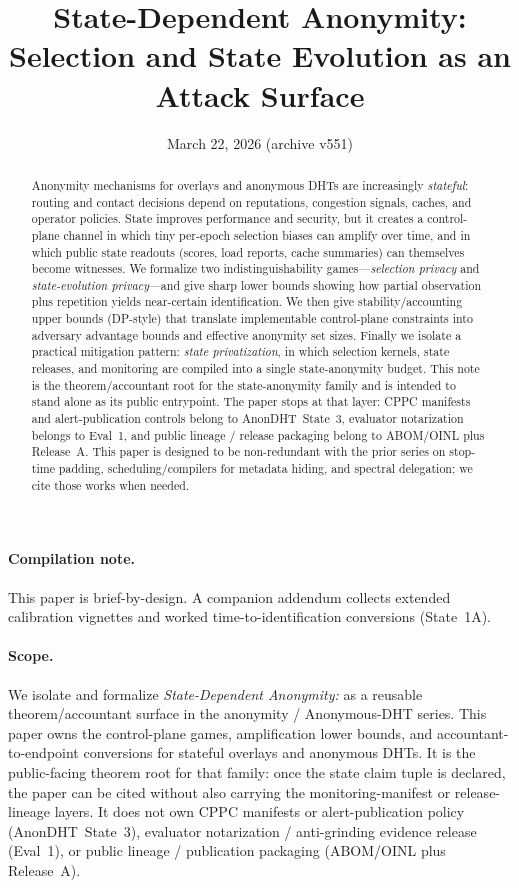 \documentclass[11pt]{article}
\title{State-Dependent Anonymity:\\Selection and State Evolution as an Attack Surface}
\author{}
\date{March 22, 2026 (archive v551)}
\begin{document}
\maketitle

\begin{abstract}
Anonymity mechanisms for overlays and anonymous DHTs are increasingly \emph{stateful}:
routing and contact decisions depend on reputations, congestion signals, caches, and operator policies.
State improves performance and security, but it creates a control-plane channel in which tiny per-epoch
selection biases can amplify over time, and in which public state readouts (scores, load reports, cache
summaries) can themselves become witnesses.
We formalize two indistinguishability games---\emph{selection privacy} and \emph{state-evolution privacy}---and give sharp lower bounds
showing how partial observation plus repetition yields near-certain identification.
We then give stability/accounting upper bounds (DP-style) that translate implementable control-plane
constraints into adversary advantage bounds and effective anonymity set sizes.
Finally we isolate a practical mitigation pattern: \emph{state privatization}, in which
selection kernels, state releases, and monitoring are compiled into a single state-anonymity budget.
This note is the theorem/accountant root for the state-anonymity family and is intended to stand alone as its public entrypoint.
The paper stops at that layer: CPPC manifests and alert-publication controls belong to
AnonDHT~State~3, evaluator notarization belongs to Eval~1, and public lineage / release packaging belong to
ABOM/OINL plus Release~A. This paper is designed to be non-redundant with the prior series on stop-time padding,
scheduling/compilers for metadata hiding, and spectral delegation; we cite those works when needed.
\end{abstract}

\paragraph{Compilation note.}
This paper is brief-by-design. A companion addendum collects extended calibration vignettes and worked time-to-identification conversions (State~1A).\cite{series:state1addendum}

\paragraph{Scope.}
We isolate and formalize \emph{State-Dependent Anonymity:} as a reusable theorem/accountant surface in the anonymity / Anonymous-DHT series.
This paper owns the control-plane games, amplification lower bounds, and accountant-to-endpoint conversions for stateful overlays and anonymous DHTs.
It is the public-facing theorem root for that family: once the state claim tuple is declared, the paper can be cited without also carrying the monitoring-manifest or release-lineage layers.
It does not own CPPC manifests or alert-publication policy (AnonDHT~State~3), evaluator notarization / anti-grinding evidence release (Eval~1), or public lineage / publication packaging (ABOM/OINL plus Release~A).\cite{series:state3,series:evalnotary,series:release}
\end{document}
